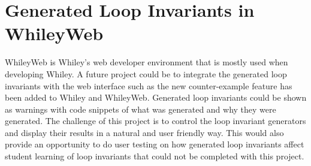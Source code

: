\section{Generated Loop Invariants in WhileyWeb}

WhileyWeb is Whiley's web developer environment that is mostly used when
developing Whiley.
A future project could be to integrate the generated loop invariants with
the web interface such as the new counter-example feature has been added to
Whiley and WhileyWeb.
Generated loop invariants could be shown as warnings with code snippets of what
was generated and why they were generated.
The challenge of this project is to control the loop invariant
generators and display their results in a natural and user friendly way.
This would also provide an opportunity to do user testing on how generated
loop invariants affect student learning of loop invariants that could not be
completed with this project.
